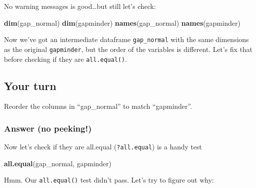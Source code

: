 \documentclass[]{book}
\newenvironment{Shaded}{\begin{snugshade}}{\end{snugshade}}
\newcommand{\KeywordTok}[1]{\textcolor[rgb]{0.13,0.29,0.53}{\textbf{#1}}}
\newcommand{\StringTok}[1]{\textcolor[rgb]{0.31,0.60,0.02}{#1}}
\newcommand{\CommentTok}[1]{\textcolor[rgb]{0.56,0.35,0.01}{\textit{#1}}}
\newcommand{\OperatorTok}[1]{\textcolor[rgb]{0.81,0.36,0.00}{\textbf{#1}}}
\newcommand{\NormalTok}[1]{#1}
\theoremstyle{definition}
\theoremstyle{definition}
\theoremstyle{definition}
\theoremstyle{remark}
\begin{document}
No warning messages is good\ldots{}but still let's check:

\begin{Shaded}
\begin{Highlighting}[]
\KeywordTok{dim}\NormalTok{(gap_normal)}
\KeywordTok{dim}\NormalTok{(gapminder)}
\KeywordTok{names}\NormalTok{(gap_normal)}
\KeywordTok{names}\NormalTok{(gapminder)}
\end{Highlighting}
\end{Shaded}

Now we've got an intermediate dataframe \texttt{gap\_normal} with the
same dimensions as the original \texttt{gapminder}, but the order of the
variables is different. Let's fix that before checking if they are
\texttt{all.equal()}.

\subsection{Your turn}\label{your-turn-12}

Reorder the columns in ``gap\_normal'' to match ``gapminder''.

\subsubsection{Answer (no peeking!)}\label{answer-no-peeking-1}

\begin{Shaded}
\end{Shaded}

Now let's check if they are all.equal (\texttt{?all.equal}) is a handy
test

\begin{Shaded}
\begin{Highlighting}[]
\KeywordTok{all.equal}\NormalTok{(gap_normal, gapminder)}
\end{Highlighting}
\end{Shaded}

Hmm. Our \texttt{all.equal()} test didn't pass. Let's try to figure out
why:
\end{document}
